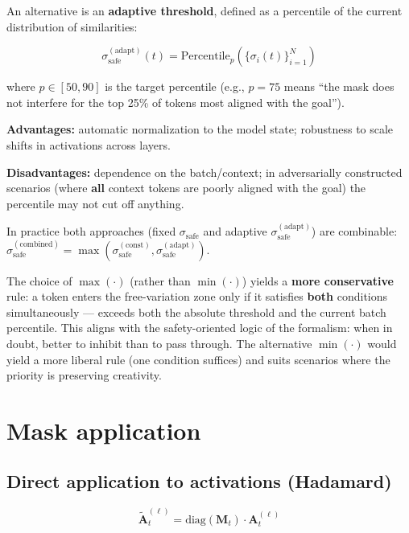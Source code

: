 \documentclass[12pt,a4paper]{article}
\begin{document}
An alternative is an \textbf{adaptive threshold}, defined as a percentile of the current distribution of similarities:

\begin{equation}
\sigma_{\text{safe}}^{(\text{adapt})}(t) = \mathrm{Percentile}_{p}\!\left(\{\sigma_i(t)\}_{i=1}^{N}\right)
\end{equation}

where $p \in [50, 90]$ is the target percentile (e.g., $p = 75$ means ``the mask does not interfere for the top 25\% of tokens most aligned with the goal'').

\textbf{Advantages:} automatic normalization to the model state; robustness to scale shifts in activations across layers.

\textbf{Disadvantages:} dependence on the batch/context; in adversarially constructed scenarios (where \textbf{all} context tokens are poorly aligned with the goal) the percentile may not cut off anything.

In practice both approaches (fixed $\sigma_{\text{safe}}$ and adaptive $\sigma_{\text{safe}}^{(\text{adapt})}$) are combinable: $\sigma_{\text{safe}}^{(\text{combined})} = \max(\sigma_{\text{safe}}^{(\text{const})}, \sigma_{\text{safe}}^{(\text{adapt})})$.

The choice of $\max(\cdot)$ (rather than $\min(\cdot)$) yields a \textbf{more conservative} rule: a token enters the free-variation zone only if it satisfies \textbf{both} conditions simultaneously --- exceeds both the absolute threshold and the current batch percentile. This aligns with the safety-oriented logic of the formalism: when in doubt, better to inhibit than to pass through. The alternative $\min(\cdot)$ would yield a more liberal rule (one condition suffices) and suits scenarios where the priority is preserving creativity.

\section{Mask application}

\subsection{Direct application to activations (Hadamard)}

\begin{equation}
\tilde{\mathbf{A}}_t^{(\ell)} = \mathrm{diag}(\mathbf{M}_t) \cdot \mathbf{A}_t^{(\ell)}
\end{equation}
\end{document}
